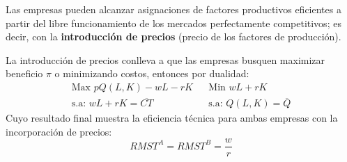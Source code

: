 \begin{frame}
	Las empresas pueden alcanzar asignaciones de factores productivos eficientes a partir del libre funcionamiento de los mercados perfectamente competitivos; es decir, con la \textbf{introducción de precios} (precio de los factores de producción).
	\begin{center}
		
	\end{center}
\end{frame}
\begin{frame}
	La introducción de precios conlleva a que las empresas busquen maximizar  beneficio $\pi$ o minimizando costos, entonces por dualidad:
		$$
			\begin{array}{ccc}
				\text{Max } pQ(L,K) - wL - rK & {} & \text{Min } wL + rK\\[0.3cm]
				\text{s.a: } wL + rK = \overline{CT}& {} & \text{s.a: } Q(L,K) = \overline{Q}
			\end{array}
		$$
	Cuyo resultado final muestra la eficiencia técnica para ambas empresas con la incorporación de precios:
		$$RMST^A = RMST^B = \frac{w}{r}$$
\end{frame}